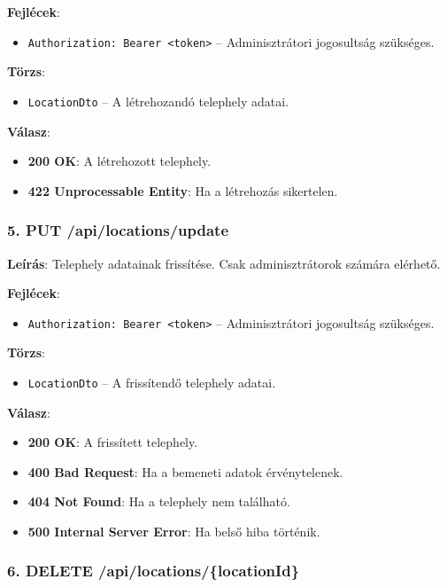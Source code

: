 \documentclass{report}[11pt]
\begin{document}
\textbf{Fejlécek}:  
\begin{itemize}
    \item \texttt{Authorization: Bearer <token>} – Adminisztrátori jogosultság szükséges.
\end{itemize}

\textbf{Törzs}:  
\begin{itemize}
    \item \texttt{LocationDto} – A létrehozandó telephely adatai.
\end{itemize}

\textbf{Válasz}:  
\begin{itemize}
    \item \textbf{200 OK}: A létrehozott telephely.
    \item \textbf{422 Unprocessable Entity}: Ha a létrehozás sikertelen.
\end{itemize}

\subsubsection{5. PUT /api/locations/update}

\textbf{Leírás}:  
Telephely adatainak frissítése. Csak adminisztrátorok számára elérhető.

\textbf{Fejlécek}:  
\begin{itemize}
    \item \texttt{Authorization: Bearer <token>} – Adminisztrátori jogosultság szükséges.
\end{itemize}

\textbf{Törzs}:  
\begin{itemize}
    \item \texttt{LocationDto} – A frissítendő telephely adatai.
\end{itemize}

\textbf{Válasz}:  
\begin{itemize}
    \item \textbf{200 OK}: A frissített telephely.
    \item \textbf{400 Bad Request}: Ha a bemeneti adatok érvénytelenek.
    \item \textbf{404 Not Found}: Ha a telephely nem található.
    \item \textbf{500 Internal Server Error}: Ha belső hiba történik.
\end{itemize}

\subsubsection{6. DELETE /api/locations/\{locationId\}}
\end{document}
